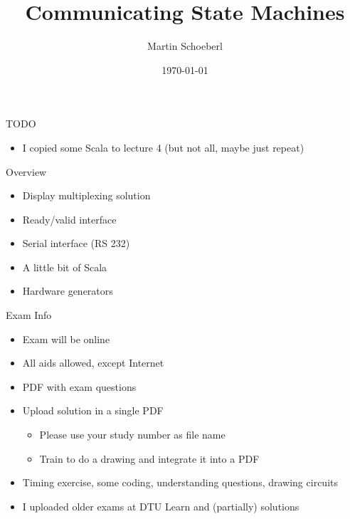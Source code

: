 

\newif\ifbook


\title{Communicating State Machines}
\author{Martin Schoeberl}
\date{\today}



\begin{frame}
\titlepage
\end{frame}

\begin{frame}[fragile]{TODO}
\begin{itemize}
\item I copied some Scala to lecture 4 (but not all, maybe just repeat)
\end{itemize}
\end{frame}

\begin{frame}[fragile]{Overview}
\begin{itemize}
\item Display multiplexing solution
\item Ready/valid interface
\item Serial interface (RS 232)
\item A little bit of Scala
\item Hardware generators
\end{itemize}
\end{frame}

\begin{frame}[fragile]{Exam Info}
\begin{itemize}
\item Exam will be online
\item All aids allowed, except Internet
\item PDF with exam questions
\item Upload solution in a single PDF
\begin{itemize}
\item Please use your study number as file name
\item Train to do a drawing and integrate it into a PDF
\end{itemize}
\item Timing exercise, some coding, understanding questions, drawing circuits
\item I uploaded older exams at DTU Learn and (partially) solutions
\end{itemize}
\end{frame}

